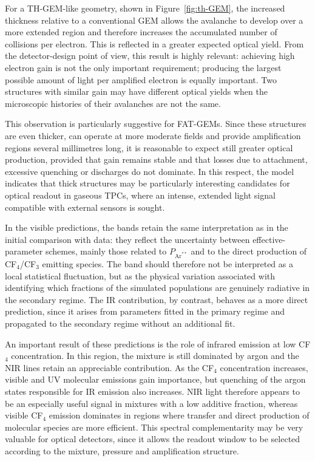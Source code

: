 \documentclass[12pt,a4paper]{article}
\newcommand{\Ar}{\mathrm{Ar}}
\begin{document}
For a TH-GEM-like geometry, shown in Figure~\ref{fig:th-GEM}, the increased thickness relative to a conventional GEM allows the avalanche to develop over a more extended region and therefore increases the accumulated number of collisions per electron. This is reflected in a greater expected optical yield. From the detector-design point of view, this result is highly relevant: achieving high electron gain is not the only important requirement; producing the largest possible amount of light per amplified electron is equally important. Two structures with similar gain may have different optical yields when the microscopic histories of their avalanches are not the same.

This observation is particularly suggestive for FAT-GEMs. Since these structures are even thicker, can operate at more moderate fields and provide amplification regions several millimetres long, it is reasonable to expect still greater optical production, provided that gain remains stable and that losses due to attachment, excessive quenching or discharges do not dominate. In this respect, the model indicates that thick structures may be particularly interesting candidates for optical readout in gaseous TPCs, where an intense, extended light signal compatible with external sensors is sought.

In the visible predictions, the bands retain the same interpretation as in the initial comparison with data: they reflect the uncertainty between effective-parameter schemes, mainly those related to $P_{\Ar^{**}}$ and to the direct production of CF$_4$/CF$_3$ emitting species. The band should therefore not be interpreted as a local statistical fluctuation, but as the physical variation associated with identifying which fractions of the simulated populations are genuinely radiative in the secondary regime. The IR contribution, by contrast, behaves as a more direct prediction, since it arises from parameters fitted in the primary regime and propagated to the secondary regime without an additional fit.

An important result of these predictions is the role of infrared emission at low CF$_4$ concentration. In this region, the mixture is still dominated by argon and the NIR lines retain an appreciable contribution. As the CF$_4$ concentration increases, visible and UV molecular emissions gain importance, but quenching of the argon states responsible for IR emission also increases. NIR light therefore appears to be an especially useful signal in mixtures with a low additive fraction, whereas visible CF$_4$ emission dominates in regions where transfer and direct production of molecular species are more efficient. This spectral complementarity may be very valuable for optical detectors, since it allows the readout window to be selected according to the mixture, pressure and amplification structure.
\end{document}
